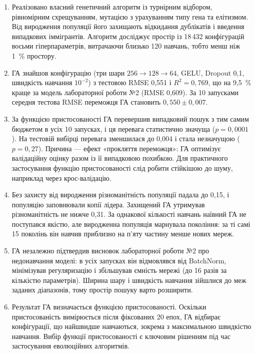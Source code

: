 \documentclass[14pt,a4paper]{extreport}
\begin{document}
\begin{enumerate}
\item Реалізовано власний генетичний алгоритм із турнірним відбором, рівномірним схрещуванням, мутацією з урахуванням типу гена та елітизмом. Від виродження популяції його захищають відкидання дублікатів і введення випадкових іммігрантів. Алгоритм досліджує простір із 18\,432 конфігурацій восьми гіперпараметрів, витрачаючи близько 120 навчань, тобто менш ніж 1~\% простору.

\item ГА знайшов конфігурацію (три шари $256 \to 128 \to 64$, GELU, Dropout 0,1, швидкість навчання $10^{-2}$) з тестовою RMSE 0,551 і $R^2 = 0{,}769$, що на 9,5~\% краще за модель лабораторної роботи №2 (RMSE 0,609). За 10 запусками середня тестова RMSE переможця ГА становить $0{,}550 \pm 0{,}007$.

\item За функцією пристосованості ГА перевершив випадковий пошук з тим самим бюджетом в усіх 10 запусках, і ця перевага статистично значуща ($p = 0{,}0001$). На тестовій вибірці перевага зменшилася до 0,004 і стала незначущою ($p = 0{,}27$). Причина --- ефект «прокляття переможця»: ГА оптимізує валідаційну оцінку разом із її випадковою похибкою. Для практичного застосування функцію пристосованості слід робити стійкішою до шуму, наприклад через крос-валідацію.

\item Без захисту від виродження різноманітність популяції падала до 0,15, і популяцію заповнювали копії лідера. Захищений ГА утримував різноманітність не нижче 0,31. За однакової кількості навчань наївний ГА не поступався якістю, але виродженна популяція марнувала покоління: за ті самі 15 поколінь він навчив приблизно на п'яту частину менше нових мереж.

\item ГА незалежно підтвердив висновок лабораторної роботи №2 про недонавчання моделі: в усіх запусках він відмовлявся від BatchNorm, мінімізував регуляризацію і збільшував ємність мережі (до 16 разів за кількістю параметрів). Ширина шару і швидкість навчання зійшлися до меж заданих діапазонів, тому простір пошуку варто розширити.

\item Результат ГА визначається функцією пристосованості. Оскільки пристосованість вимірюється після фіксованих 20 епох, ГА відбирає конфігурації, що найшвидше навчаються, зокрема з максимальною швидкістю навчання. Вибір функції пристосованості є ключовим рішенням під час застосування еволюційних алгоритмів.
\end{enumerate}
\end{document}
